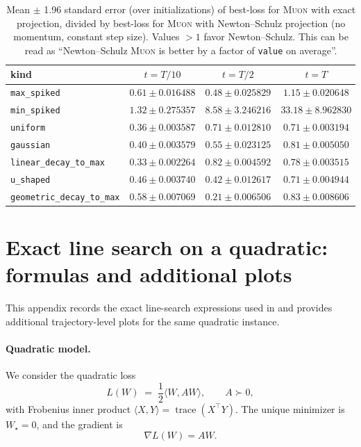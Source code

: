 \documentclass{article}
\theoremstyle{plain}
\theoremstyle{definition}
\theoremstyle{remark}
\newcommand{\tr}{\operatorname{trace}}
\newcommand{\loss}{L}
\newcommand{\Muon}{\textsc{Muon}}
\begin{document}
\begin{table}[H]
\centering
\small
\setlength{\tabcolsep}{3pt}
\renewcommand{\arraystretch}{1.15}
\caption{ Mean $\pm$ 1.96 standard error (over initializations) of best-loss for \Muon{} with exact projection, divided by best-loss for \Muon{} with Newton--Schulz projection (no momentum, constant step size). 
Values $>1$ favor Newton--Schulz.  
This can be read as ``Newton--Schulz \Muon{} is better by a factor of \texttt{value} on average''.}
\label{tab:ns-vs-exact-lossratios}
\begin{tabular}{lccc}
\toprule
kind & $t=T/10$ & $t=T/2$ & $t=T$ \\
\midrule
\texttt{max\_spiked} & $0.61 \pm 0.016488$ & $0.48 \pm 0.025829$ & $1.15 \pm 0.020648$ \\
\texttt{min\_spiked} & $1.32 \pm 0.275357$ & $8.58 \pm 3.246216$ & $33.18 \pm 8.962830$ \\
\texttt{uniform} & $0.36 \pm 0.003587$ & $0.71 \pm 0.012810$ & $0.71 \pm 0.003194$ \\
\texttt{gaussian} & $0.40 \pm 0.003579$ & $0.55 \pm 0.023125$ & $0.81 \pm 0.005050$ \\
\texttt{linear\_decay\_to\_max} & $0.33 \pm 0.002264$ & $0.82 \pm 0.004592$ & $0.78 \pm 0.003515$ \\
\texttt{u\_shaped} & $0.46 \pm 0.003740$ & $0.42 \pm 0.012617$ & $0.71 \pm 0.004944$ \\
\texttt{geometric\_decay\_to\_max} & $0.58 \pm 0.007069$ & $0.21 \pm 0.006506$ & $0.83 \pm 0.008606$ \\
\bottomrule
\end{tabular}
\end{table}

\section{Exact line search on a quadratic: formulas and additional plots}
\label{app:exact-1d-line-search}

This appendix records the exact line-search expressions used in  and provides additional trajectory-level plots for the same quadratic instance.

\paragraph{Quadratic model.}
We consider the quadratic loss
\begin{equation}
\loss(W)
\;=\;
\frac12 \langle W, A W\rangle,
\qquad A \succ 0,
\label{eq:quad-app}
\end{equation}
with Frobenius inner product $\langle X,Y\rangle=\tr(X^\top Y)$.
The unique minimizer is $W_\star=0$, and the gradient is
\begin{equation}
\nabla \loss(W) = A W .
\label{eq:grad-app}
\end{equation}
\end{document}
